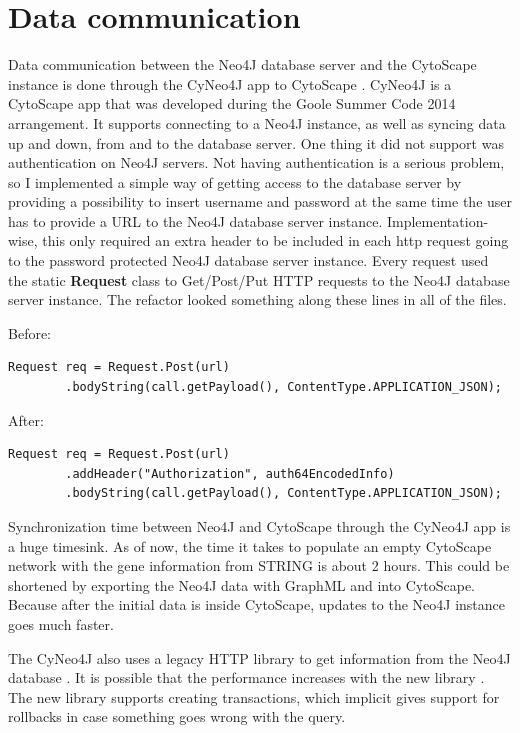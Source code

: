 \documentclass[UKenglish]{ifimaster}
\begin{document}
\section{Data communication}
Data communication between the Neo4J database server and the CytoScape instance
is done through the CyNeo4J app to CytoScape \cite{cyneo4j}. CyNeo4J is a
CytoScape app that was developed during the Goole Summer Code 2014 arrangement.
It supports connecting to a Neo4J instance, as well as syncing data up and down,
from and to the database server. One thing it did not support was authentication
on Neo4J servers. Not having authentication is a serious problem, so I
implemented a simple way of getting access to the database server by providing a
possibility to insert username and password at the same time the user has to
provide a URL to the Neo4J database server instance. Implementation-wise, this
only required an extra header to be included in each http request going to the
password protected Neo4J database server instance. Every request used the static
\textbf{Request} class to Get/Post/Put HTTP requests to the Neo4J database
server instance. The refactor looked something along these lines in all of the
files.

Before:
\begin{verbatim}
Request req = Request.Post(url)
        .bodyString(call.getPayload(), ContentType.APPLICATION_JSON);
\end{verbatim}

After:
\begin{verbatim}
Request req = Request.Post(url)
        .addHeader("Authorization", auth64EncodedInfo)
        .bodyString(call.getPayload(), ContentType.APPLICATION_JSON);
\end{verbatim}

Synchronization time between Neo4J and CytoScape through the CyNeo4J app is a
huge timesink. As of now, the time it takes to populate an empty CytoScape
network with the gene information from STRING is about 2 hours. This could be
shortened by exporting the Neo4J data with GraphML and into CytoScape. Because
after the initial data is inside CytoScape, updates to the Neo4J instance goes
much faster.

The CyNeo4J also uses a legacy HTTP library to get information from the Neo4J
database \cite{legacy-neo4j}. It is possible that the performance increases with
the new library \cite{transactional-neo4j}. The new library supports creating
transactions, which implicit gives support for rollbacks in case something goes
wrong with the query.
\end{document}
